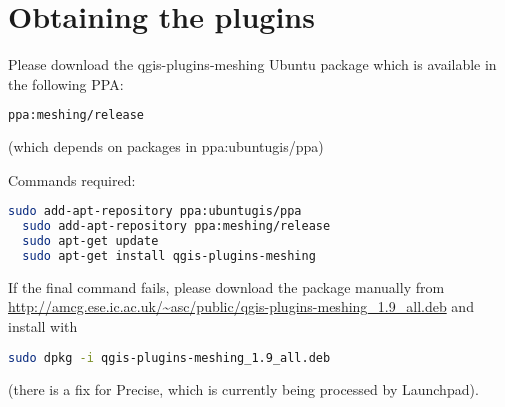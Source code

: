 \section{Obtaining the plugins}
\label{sect:obtaining_the_plugins}
Please download the qgis-plugins-meshing Ubuntu package which is available in the following PPA:

\begin{example}
  \begin{lstlisting}[language=bash]
  ppa:meshing/release
\end{lstlisting}
\end{example}

(which depends on packages in ppa:ubuntugis/ppa)

Commands required:
\begin{example}
  \begin{lstlisting}[language=bash]
  sudo add-apt-repository ppa:ubuntugis/ppa
  sudo add-apt-repository ppa:meshing/release
  sudo apt-get update
  sudo apt-get install qgis-plugins-meshing
\end{lstlisting}
\end{example}

If the final command fails, please download the package manually from
\url{http://amcg.ese.ic.ac.uk/~asc/public/qgis-plugins-meshing_1.9_all.deb}
and install with

\begin{example}
  \begin{lstlisting}[language=bash]
  sudo dpkg -i qgis-plugins-meshing_1.9_all.deb
\end{lstlisting}
\end{example}

(there is a fix for Precise, which is currently being processed by Launchpad).

